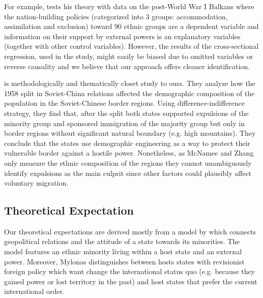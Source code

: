 For example, \citet{mylonas_politics_2013} tests his theory with data on the post-World War I Balkans where the nation-building policies (categorized into 3 groups: accommodation, assimilation and exclusion)  toward  90 ethnic groups are a dependent variable and information on their support by external powers is an explanatory variables (together with other control variables). However, the results of the cross-sectional regression, used in the study, might easily be biased due to omitted variables or reverse causality and we believe that our approach offers cleaner identification.



\citet{mcnamee_demographic_2019} is methodologically and thematically closet study to ours. They analyze how the 1958 split in Soviet-China relations affected the demographic composition of the population in the Soviet-Chinese border regions.
Using difference-indifference strategy, they find that, after the split  both states supported expulsions  of the minority group and sponsored immigration of the majority group but only in border regions without significant natural boundary (e.g. high mountains). They conclude that the states use demographic engineering as a way to protect their vulnerable border against a hostile power. Nonetheless, as McNamee and Zhang only measure the ethnic composition of the regions they cannot unambiguously identify expulsions as the main culprit since other factors could plausibly affect voluntary migration. %


\subsection{Theoretical Expectation}
Our theoretical expectations are  derived mostly from a model by    \citet{mylonas_politics_2013} which connects geopolitical relations and  the attitude of a state towards its minorities. The model features an ethnic minority living within a host state and  an external power. Moreover, Mylonas distinguishes between hosts states with revisionist foreign policy which want change the international status quo (e.g. because they gained power or lost territory in the past) and host states that prefer the current international order. 


